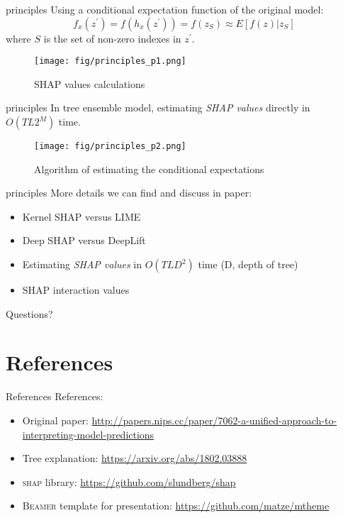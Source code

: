\documentclass[10pt]{beamer}
\newcommand{\shap}{\emph{SHAP values}\xspace}
\begin{document}
\begin{frame}{principles}
  Using a conditional expectation function of the original model:
  $$f_x(z^{'}) = f(h_x(z^{'})) = f(z_S) \approx E[f(z)|z_S]$$
  where $S$ is the set of non-zero indexes in $z^{'}$.

  \begin{figure}[htbp]
    \centering
    \texttt{[image: fig/principles\_p1.png]}
    \caption{SHAP values calculations}
  \end{figure}

\end{frame}

\begin{frame}{principles}
  In tree ensemble model, estimating \shap directly in $O(TL2^M)$ time.

  \begin{figure}[htbp]
    \centering
    \texttt{[image: fig/principles\_p2.png]}
    \caption{Algorithm of estimating the conditional expectations}
  \end{figure}

\end{frame}

\begin{frame}{principles}
  More details we can find and discuss in paper:
  \begin{itemize}
    \item Kernel SHAP versus LIME
    \item Deep SHAP versus DeepLift
    \item Estimating \shap in $O(TLD^2)$ time (D, depth of tree)
    \item SHAP interaction values
  \end{itemize}
\end{frame}

\begin{frame}[standout]
  Questions?
\end{frame}

\section{References}

\begin{frame}{References}
  References:
  \begin{itemize}
    \item Original paper: \url{http://papers.nips.cc/paper/7062-a-unified-approach-to-interpreting-model-predictions}
    \item Tree explanation: \url{https://arxiv.org/abs/1802.03888}
    \item \textsc{shap} library: \url{https://github.com/slundberg/shap}
    \item \textsc{Beamer} template for presentation: \url{https://github.com/matze/mtheme}
  \end{itemize}
\end{frame}
\end{document}
